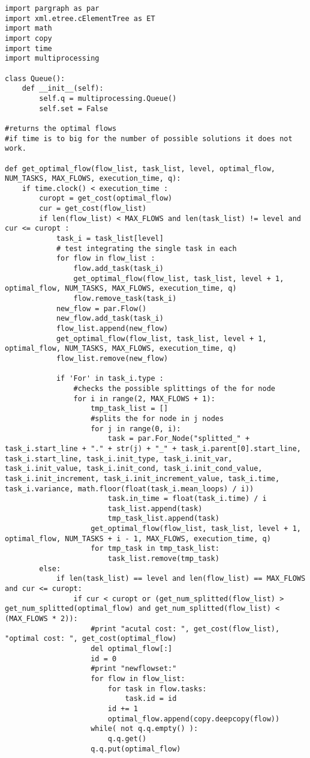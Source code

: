 \documentclass[a4paper,11pt,twoside]{book}
\begin{document}
\begin{lstlisting}[language=CCC, caption=graphCreator.py]
import pargraph as par
import xml.etree.cElementTree as ET
import math
import copy
import time
import multiprocessing

class Queue():
	def __init__(self):
		self.q = multiprocessing.Queue()
		self.set = False

#returns the optimal flows 
#if time is to big for the number of possible solutions it does not work.

def get_optimal_flow(flow_list, task_list, level, optimal_flow, NUM_TASKS, MAX_FLOWS, execution_time, q):
	if time.clock() < execution_time :
		curopt = get_cost(optimal_flow)
		cur = get_cost(flow_list)
		if len(flow_list) < MAX_FLOWS and len(task_list) != level and cur <= curopt :
			task_i = task_list[level]
			# test integrating the single task in each
			for flow in flow_list :
				flow.add_task(task_i)
				get_optimal_flow(flow_list, task_list, level + 1, optimal_flow, NUM_TASKS, MAX_FLOWS, execution_time, q)
				flow.remove_task(task_i)
			new_flow = par.Flow()		
			new_flow.add_task(task_i)
			flow_list.append(new_flow)
			get_optimal_flow(flow_list, task_list, level + 1, optimal_flow, NUM_TASKS, MAX_FLOWS, execution_time, q)
			flow_list.remove(new_flow)

			if 'For' in task_i.type :
				#checks the possible splittings of the for node
				for i in range(2, MAX_FLOWS + 1):
					tmp_task_list = []
					#splits the for node in j nodes
					for j in range(0, i):
						task = par.For_Node("splitted_" + task_i.start_line + "." + str(j) + "_" + task_i.parent[0].start_line, task_i.start_line, task_i.init_type, task_i.init_var, task_i.init_value, task_i.init_cond, task_i.init_cond_value, task_i.init_increment, task_i.init_increment_value, task_i.time, task_i.variance, math.floor(float(task_i.mean_loops) / i))
						task.in_time = float(task_i.time) / i
						task_list.append(task)
						tmp_task_list.append(task)
					get_optimal_flow(flow_list, task_list, level + 1, optimal_flow, NUM_TASKS + i - 1, MAX_FLOWS, execution_time, q)
					for tmp_task in tmp_task_list:
						task_list.remove(tmp_task)		
		else:
			if len(task_list) == level and len(flow_list) == MAX_FLOWS and cur <= curopt:
				if cur < curopt or (get_num_splitted(flow_list) > get_num_splitted(optimal_flow) and get_num_splitted(flow_list) < (MAX_FLOWS * 2)):
					#print "acutal cost: ", get_cost(flow_list), "optimal cost: ", get_cost(optimal_flow)
					del optimal_flow[:]
					id = 0
					#print "newflowset:"
					for flow in flow_list:
						for task in flow.tasks:
							task.id = id
						id += 1
						optimal_flow.append(copy.deepcopy(flow))
					while( not q.q.empty() ):
						q.q.get()
					q.q.put(optimal_flow)


\end{lstlisting}
\end{document}
